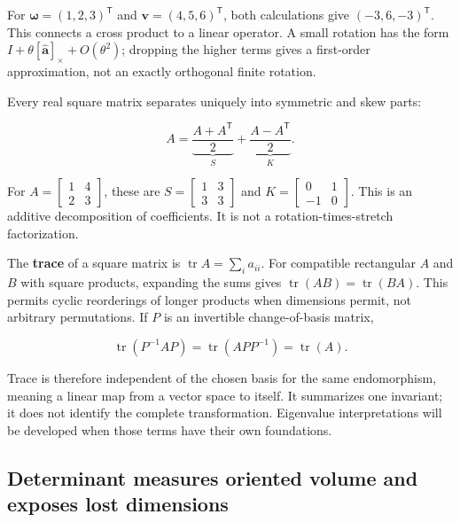 For \(\boldsymbol\omega=(1,2,3)^{\mathsf T}\) and \(\mathbf v=(4,5,6)^{\mathsf T}\), both calculations give \((-3,6,-3)^{\mathsf T}\). This connects a cross product to a linear operator. A small rotation has the form \(I+\theta[\widehat{\mathbf a}]_\times+O(\theta^2)\); dropping the higher terms gives a first-order approximation, not an exactly orthogonal finite rotation.

Every real square matrix separates uniquely into symmetric and skew parts:

\[
A=\underbrace{\frac{A+A^{\mathsf T}}2}_{S}
+\underbrace{\frac{A-A^{\mathsf T}}2}_{K}.
\]

For \(A=\begin{bmatrix}1&4\\2&3\end{bmatrix}\), these are \(S=\begin{bmatrix}1&3\\3&3\end{bmatrix}\) and \(K=\begin{bmatrix}0&1\\-1&0\end{bmatrix}\). This is an additive decomposition of coefficients. It is not a rotation-times-stretch factorization.

The \textbf{trace} of a square matrix is \(\operatorname{tr}A=\sum_i a_{ii}\). For compatible rectangular \(A\) and \(B\) with square products, expanding the sums gives \(\operatorname{tr}(AB)=\operatorname{tr}(BA)\). This permits cyclic reorderings of longer products when dimensions permit, not arbitrary permutations. If \(P\) is an invertible change-of-basis matrix,

\[
\operatorname{tr}(P^{-1}AP)=\operatorname{tr}(APP^{-1})=\operatorname{tr}(A).
\]

Trace is therefore independent of the chosen basis for the same endomorphism, meaning a linear map from a vector space to itself. It summarizes one invariant; it does not identify the complete transformation. Eigenvalue interpretations will be developed when those terms have their own foundations.

\subsection{Determinant measures oriented volume and exposes lost dimensions}\label{01-foundations-i-ch018-determinant-measures-oriented-volume-and-exposes-lost-dimensions}

\hypertarget{01-foundations-i-ch018-determinant-measures-oriented-volume-and-exposes-lost-dimensions}{}

